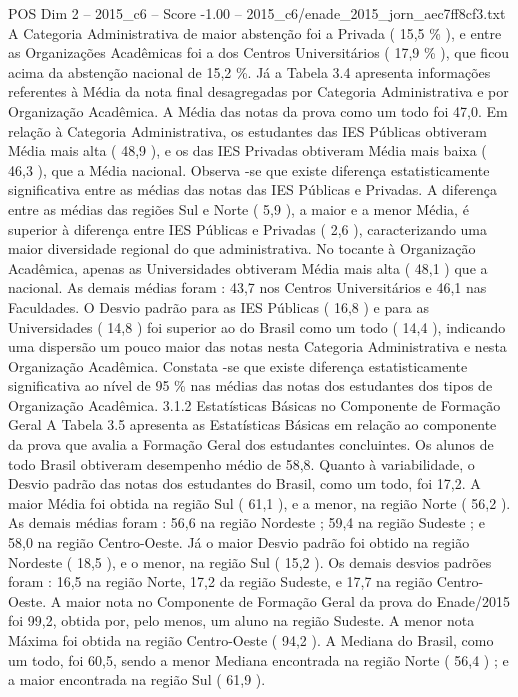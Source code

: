 \begin{textsample}{POS Dim 2 – 2015\_c6 – Score -1.00 – 2015\_c6/enade\_2015\_jorn\_aec7ff8cf3.txt}
A Categoria Administrativa de maior abstenção foi a Privada ( 15,5 \% ), e entre as Organizações Acadêmicas foi a dos Centros Universitários ( 17,9 \% ), que ficou acima da abstenção nacional de 15,2 \%.
Já a Tabela 3.4 apresenta informações referentes à Média da nota final desagregadas por Categoria Administrativa e por Organização Acadêmica.
A Média das notas da prova como um todo foi 47,0.
Em relação à Categoria Administrativa, os estudantes das IES Públicas obtiveram Média mais alta ( 48,9 ), e os das IES Privadas obtiveram Média mais baixa ( 46,3 ), que a Média nacional.
Observa -se que existe diferença estatisticamente significativa entre as médias das notas das IES Públicas e Privadas.
A diferença entre as médias das regiões Sul e Norte ( 5,9 ), a maior e a menor Média, é superior à diferença entre IES Públicas e Privadas ( 2,6 ), caracterizando uma maior diversidade regional do que administrativa.
No tocante à Organização Acadêmica, apenas as Universidades obtiveram Média mais alta ( 48,1 ) que a nacional.
As demais médias foram : 43,7 nos Centros Universitários e 46,1 nas Faculdades.
O Desvio padrão para as IES Públicas ( 16,8 ) e para as Universidades ( 14,8 ) foi superior ao do Brasil como um todo ( 14,4 ), indicando uma dispersão um pouco maior das notas nesta Categoria Administrativa e nesta Organização Acadêmica.
Constata -se que existe diferença estatisticamente significativa ao nível de 95 \% nas médias das notas dos estudantes dos tipos de Organização Acadêmica. 3.1.2 Estatísticas Básicas no Componente de Formação Geral A Tabela 3.5 apresenta as Estatísticas Básicas em relação ao componente da prova que avalia a Formação Geral dos estudantes concluintes.
Os alunos de todo Brasil obtiveram desempenho médio de 58,8.
Quanto à variabilidade, o Desvio padrão das notas dos estudantes do Brasil, como um todo, foi 17,2.
A maior Média foi obtida na região Sul ( 61,1 ), e a menor, na região Norte ( 56,2 ).
As demais médias foram : 56,6 na região Nordeste ; 59,4 na região Sudeste ; e 58,0 na região Centro-Oeste.
Já o maior Desvio padrão foi obtido na região Nordeste ( 18,5 ), e o menor, na região Sul ( 15,2 ).
Os demais desvios padrões foram : 16,5 na região Norte, 17,2 da região Sudeste, e 17,7 na região Centro-Oeste.
A maior nota no Componente de Formação Geral da prova do Enade/2015 foi 99,2, obtida por, pelo menos, um aluno na região Sudeste.
A menor nota Máxima foi obtida na região Centro-Oeste ( 94,2 ).
A Mediana do Brasil, como um todo, foi 60,5, sendo a menor Mediana encontrada na região Norte ( 56,4 ) ; e a maior encontrada na região Sul ( 61,9 ).

\end{textsample}
